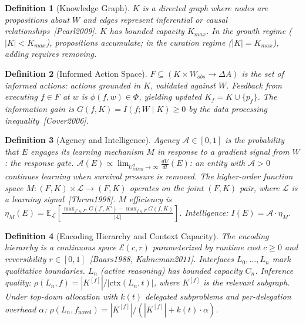 \documentclass[11pt]{article}
\newtheorem{definition}{Definition}
\begin{document}
\begin{definition}[Knowledge Graph]
$K$ is a directed graph where nodes are propositions about $W$ and edges represent inferential or causal relationships~[Pearl2009]. $K$ has bounded capacity $K_{max}$. In the \emph{growth regime} ($|K| < K_{max}$), propositions accumulate; in the \emph{curation regime} ($|K| = K_{max}$), adding requires removing.
\end{definition}

\begin{definition}[Informed Action Space]
$F \subseteq (K \times W_{obs} \to \Delta A)$ is the set of informed actions: actions grounded in $K$, validated against $W$. Feedback from executing $f \in F$ at $w$ is $\phi(f,w) \in \Phi$, yielding updated $K_f = K \cup \{p_f\}$. The information gain is $G(f,K) = I(f; W \mid K) \geq 0$ by the data processing inequality~[Cover2006].
\end{definition}

\begin{definition}[Agency and Intelligence]
Agency $\mathcal{A} \in [0,1]$ is the probability that $E$ engages its learning mechanism $M$ in response to a gradient signal from $W$: the response gate. $\mathcal{A}(E) \propto \lim_{U_{lethal}^d \to \infty} \frac{dU}{dt}(E)$: an entity with $\mathcal{A} > 0$ continues learning when survival pressure is removed. The higher-order function space $M : (F,K) \times \mathcal{L} \to (F,K)$ operates on the joint $(F,K)$ pair, where $\mathcal{L}$ is a learning signal~[Thrun1998]. $M$ efficiency is $\eta_M(E) = \mathbb{E}_\mathcal{L}\!\left[\frac{\max_{f' \in F'} G(f',K') - \max_{f \in F} G(f,K)}{|\mathcal{L}|}\right]$. Intelligence: $I(E) = \mathcal{A} \cdot \eta_M$.
\end{definition}

\begin{definition}[Encoding Hierarchy and Context Capacity]\label{def:encoding}
The encoding hierarchy is a continuous space $\mathcal{E}(c,r)$ parameterized by runtime cost $c \geq 0$ and reversibility $r \in [0,1]$~[Baars1988, Kahneman2011]. Interfaces $L_0, \ldots, L_n$ mark qualitative boundaries. $L_n$ (active reasoning) has bounded capacity $C_n$. Inference quality: $\rho(L_n, f) = |K^{[f]}| / |\text{ctx}(L_n, t)|$, where $K^{[f]}$ is the relevant subgraph. Under top-down allocation with $k(t)$ delegated subproblems and per-delegation overhead $\alpha$: $\rho(L_n, f_{\text{novel}}) = |K^{[f]}| / (|K^{[f]}| + k(t) \cdot \alpha)$.
\end{definition}
\end{document}
